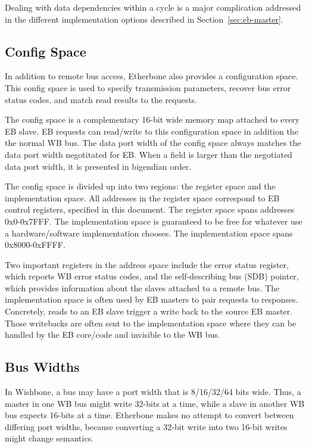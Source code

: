 \documentclass{article}
\begin{document}
Dealing with data dependencies within a cycle is a major complication
addressed in the different implementation options described in
Section~\ref{sec:eb-master}.

\subsection{Config Space}

In addition to remote bus access, 
Etherbone also provides a configuration space.
This config space is used to specify transmission parameters,
recover bus error status codes,
and match read results to the requests.

The config space is a complementary 16-bit wide memory map attached to every EB slave.
EB requests can read/write to this configuration space in addition the the normal WB bus.
The data port width of the config space always matches the data port width negotitated for EB.
When a field is larger than the negotiated data port width, it is presented in bigendian order.

The config space is divided up into two regions: the register space and the implementation space.
All addresses in the register space correspond to EB control registers,
specified in this document.
The register space spans addresses 0x0-0x7FFF.
The implementation space is guaranteed to be free for whatever use
a hardware/software implementation chooses.
The implementation space spans 0x8000-0xFFFF.

Two important registers in the address space include the error status
register, which reports WB error status codes, and the self-describing bus (SDB) pointer,
which provides information about the slaves attached to a remote bus.
The implementation space is often used by EB masters to pair requests to responses.
Concretely, reads to an EB slave trigger a write back to the source EB master.
Those writebacks are often sent to the implementation space 
where they can be handled by the EB core/code and invisible to the WB bus.

\subsection{Bus Widths}

In Wishbone, 
a bus may have a port width that is 8/16/32/64 bits wide.
Thus, a master in one WB bus might write 32-bits at a time,
while a slave in another WB bus expects 16-bits at a time.
Etherbone makes no attempt to convert between differing port widths,
because converting a 32-bit write into two 16-bit writes might change semantics.
\end{document}
